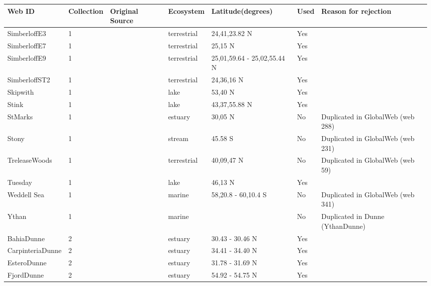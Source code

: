 \documentclass[12pt]{article}
\begin{document}
\begin{landscape}
    \begin{table}[h!]
    \centering
    {\footnotesize
      \begin{tabular}{p{2.8cm}p{1.3cm}p{3cm}p{2.2cm}p{2.5cm}lp{8.2cm}}
        \hline
        Web ID & Collection & Original Source & Ecosystem & Latitude(degrees) & Used  & Reason for rejection  \\
        \hline
        SimberloffE3 & 1 & \cite{Simberloff1976}  & terrestrial & 24,41,23.82 N & Yes   &       \\
        SimberloffE7 & 1 & \cite{Simberloff1976}  & terrestrial & 25,15 N & Yes   &       \\
        SimberloffE9 & 1 & \cite{Simberloff1976}  & terrestrial & 25,01,59.64 - 25,02,55.44 N & Yes   &       \\
        SimberloffST2 & 1 & \cite{Simberloff1976}  & terrestrial & 24,36,16 N & Yes   &       \\
        Skipwith & 1 & \cite{Warren1989}  & lake  & 53,40 N & Yes   &       \\
        Stink & 1 & \cite{Havens1992}    & lake  & 43,37,55.88 N & Yes   &       \\
        StMarks & 1 & \cite{Christian1999}    & estuary & 30,05 N & No    & Duplicated in GlobalWeb (web 288) \\
        Stony  & 1 & \cite{Townsend1998}  & stream & 45.58 S & No    & Duplicated in GlobalWeb (web 231) \\
        TreleaseWoods & 1 & \cite{Twomey1945}    & terrestrial & 40,09,47 N & No    & Duplicated in GlobalWeb (web 59) \\
        Tuesday & 1 & \cite{Jonsson2005}    & lake  & 46,13 N & Yes   &       \\
        Weddell Sea & 1 & \cite{Brose2005}  & marine & 58,20.8 - 60,10.4 S & No    & Duplicated in GlobalWeb (web 341) \\
        Ythan & 1 & \cite{Huxham1996}     & marine &       & No    & Duplicated in Dunne (YthanDunne) \\
        BahiaDunne & 2 & \cite{Hechinger2011}  & estuary & 30.43 - 30.46 N & Yes   &        \\
        CarpinteriaDunne & 2 & \cite{Hechinger2011}    & estuary & 34.41 - 34.40 N & Yes   &        \\
        EsteroDunne & 2 & \cite{Hechinger2011}  & estuary & 31.78 - 31.69 N & Yes   &        \\
        FjordDunne & 2 & \cite{Zander2011}  & estuary & 54.92 - 54.75 N & Yes   &        \\

\end{tabular}}
\end{table}
\end{landscape}
\end{document}
